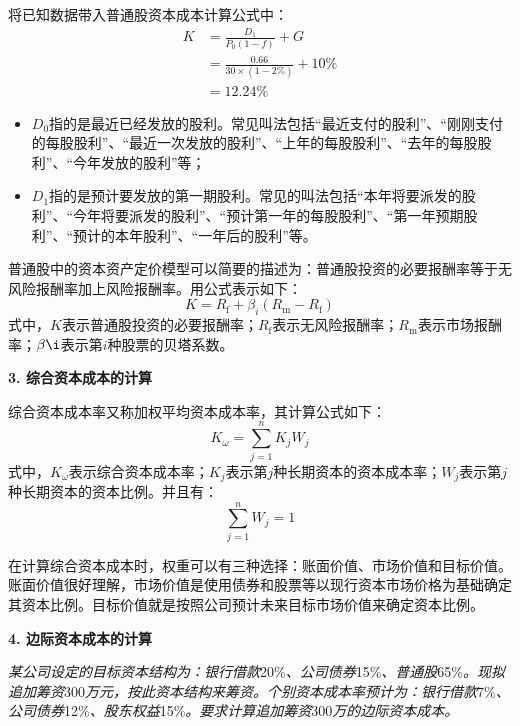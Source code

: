 \documentclass[
  10pt,
  twoside,
  openany,
  b5paper, %
  colorscheme = black, %
  xits = false,
]{qyxf-book}
\begin{document}
将已知数据带入普通股资本成本计算公式中：
\begin{equation*}
	\begin{aligned}
		K &= \frac{D_1}{P_0(1-f)} +G \\[1.5ex] &= \frac{0.66}{30 \times (1-2\%)} + 10\% \\[1.5ex]
		&= 12.24\%
	\end{aligned}
\end{equation*}
\begin{note}
	\begin{itemize}
		\item $D_0$指的是最近已经发放的股利。常见叫法包括“最近支付的股利”、“刚刚支付的每股股利”、“最近一次发放的股利”、“上年的每股股利”、“去年的每股股利”、“今年发放的股利”等；
		\item $D_1$指的是预计要发放的第一期股利。常见的叫法包括“本年将要派发的股利”、“今年将要派发的股利”、“预计第一年的每股股利”、“第一年预期股利”、“预计的本年股利”、“一年后的股利”等。
	\end{itemize}

\end{note}
普通股中的资本资产定价模型可以简要的描述为：普通股投资的必要报酬率等于无风险报酬率加上风险报酬率。用公式表示如下：
\begin{equation*}
	K = R_\mathrm{f} + \beta_i(R_\mathrm{m} - R_\mathrm{f})
\end{equation*}
式中，$K$表示普通股投资的必要报酬率；$R_\mathrm{f}$表示无风险报酬率；$R_\mathrm{m}$表示市场报酬率；$\beta\i$表示第$i$种股票的贝塔系数。

\newpage

\textbf{3. 综合资本成本的计算}

综合资本成本率又称加权平均资本成本率，其计算公式如下：
\begin{equation*}
	K_\omega = \sum_{j=1}^{n} K_jW_j
\end{equation*}
式中，$K_\omega$表示综合资本成本率；$K_j$表示第$j$种长期资本的资本成本率；$W_j$表示第$j$种长期资本的资本比例。并且有：
\begin{equation*}
	\sum_{j=1}^{n} W_j =1
\end{equation*}

在计算综合资本成本时，权重可以有三种选择：账面价值、市场价值和目标价值。账面价值很好理解，市场价值是使用债券和股票等以现行资本市场价格为基础确定其资本比例。目标价值就是按照公司预计未来目标市场价值来确定资本比例。

\textbf{4. 边际资本成本的计算}

\emph{某公司设定的目标资本结构为：银行借款}20\%\emph{、公司债券}15\%\emph{、普通股}65\%\emph{。现拟追加筹资}300\emph{万元，按此资本结构来筹资。个别资本成本率预计为：银行借款}7\%\emph{、公司债券}12\%\emph{、股东权益}15\%\emph{。要求计算追加筹资}300\emph{万的边际资本成本。 }
\end{document}

